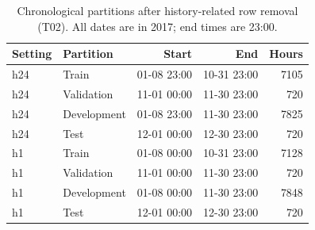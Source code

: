\begin{table}[H]\centering\small
\caption{Chronological partitions after history-related row removal (T02). All dates are in 2017; end times are 23:00.}\label{tab:splits}
\setlength{\tabcolsep}{4pt}
\begin{tabular}{llrrr}
\toprule
Setting & Partition & Start & End & Hours \\
\midrule
h24 & Train & 01-08 23:00 & 10-31 23:00 & \num{7105} \\
h24 & Validation & 11-01 00:00 & 11-30 23:00 & \num{720} \\
h24 & Development & 01-08 23:00 & 11-30 23:00 & \num{7825} \\
h24 & Test & 12-01 00:00 & 12-30 23:00 & \num{720} \\
h1 & Train & 01-08 00:00 & 10-31 23:00 & \num{7128} \\
h1 & Validation & 11-01 00:00 & 11-30 23:00 & \num{720} \\
h1 & Development & 01-08 00:00 & 11-30 23:00 & \num{7848} \\
h1 & Test & 12-01 00:00 & 12-30 23:00 & \num{720} \\
\bottomrule\end{tabular}
\end{table}
